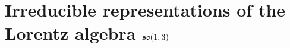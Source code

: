 

\section{Irreducible representations of the Lorentz algebra $\mathfrak{so}(1,3)$}
\setcounter{theorem}{0}
\setcounter{equation}{0}


\renewcommand{\theenumi}{\roman{enumi}}
\renewcommand{\labelenumi}{\textnormal{(\theenumi)}$\;\;$}




